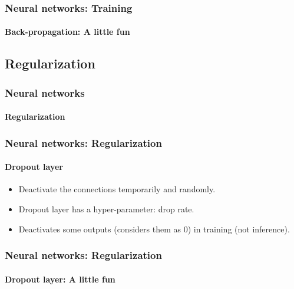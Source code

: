 \documentclass[xcolor=table]{beamer}
\begin{document}
\begin{frame}
	\frametitle{Neural networks: Training}
	\framesubtitle{Back-propagation: A little fun}
	
	
	
\end{frame}

\subsection{Regularization}

\begin{frame}
	\frametitle{Neural networks}
	\framesubtitle{Regularization}

	
\end{frame}

\begin{frame}
	\frametitle{Neural networks: Regularization}
	\framesubtitle{Dropout layer}
	
	\begin{itemize}
		\item Deactivate the connections temporarily and randomly.
		\item Dropout layer has a hyper-parameter: drop rate.
		\item Deactivates some outputs (considers them as 0) in training (not inference).
	\end{itemize}
	
\end{frame}


\begin{frame}
	\frametitle{Neural networks: Regularization}
	\framesubtitle{Dropout layer: A little fun}
	
	
\end{frame}


\end{document}
